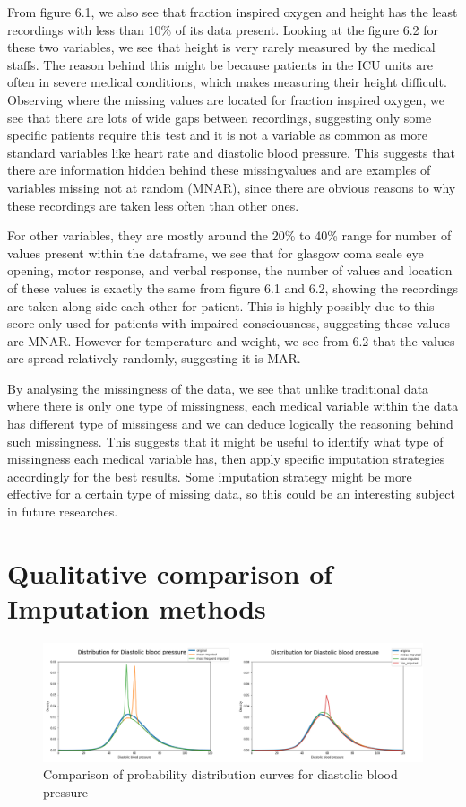 \documentclass{l4proj}
\begin{document}
From figure 6.1, we also see that fraction inspired oxygen and height has the least recordings with less than 10\% of its data present. Looking at the figure 6.2 for these two variables, we see that height is very rarely measured by the medical staffs. The reason behind this might be because patients in the ICU units are often in severe medical conditions, which makes measuring their height difficult. Observing where the missing values are located for fraction inspired oxygen, we see that there are lots of wide gaps between recordings, suggesting only some specific patients require this test and it is not a variable as common as more standard variables like heart rate and diastolic blood pressure. This suggests that there are information hidden behind these missingvalues and are examples of variables missing not at random (MNAR), since there are obvious reasons to why these recordings are taken less often than other ones.

For other variables, they are mostly around the 20\% to 40\% range for number of values present within the dataframe, we see that for glasgow coma scale eye opening, motor response, and verbal response, the number of values and location of these values is exactly the same from figure 6.1 and 6.2, showing the recordings are taken along side each other for patient. This is highly possibly due to this score only used for patients with impaired consciousness, suggesting these values are MNAR. However for temperature and weight, we see from 6.2 that the values are spread relatively randomly, suggesting it is MAR.

By analysing the missingness of the data, we see that unlike traditional data where there is only one type of missingness, each medical variable within the data has different type of missingess and we can deduce logically the reasoning behind such missingness. This suggests that it might be useful to identify what type of missingness each medical variable has, then apply specific imputation strategies accordingly for the best results. Some imputation strategy might be more effective for a certain type of missing data, so this could be an interesting subject in future researches.

\section{Qualitative comparison of Imputation methods}



\begin{figure}[!htb]
  \caption{Comparison of probability distribution curves for diastolic blood pressure}
  \includegraphics[width=\textwidth]{dissertation/Latex/images/Diastolic blood pressure distribution.PNG}
\end{figure}
\end{document}
